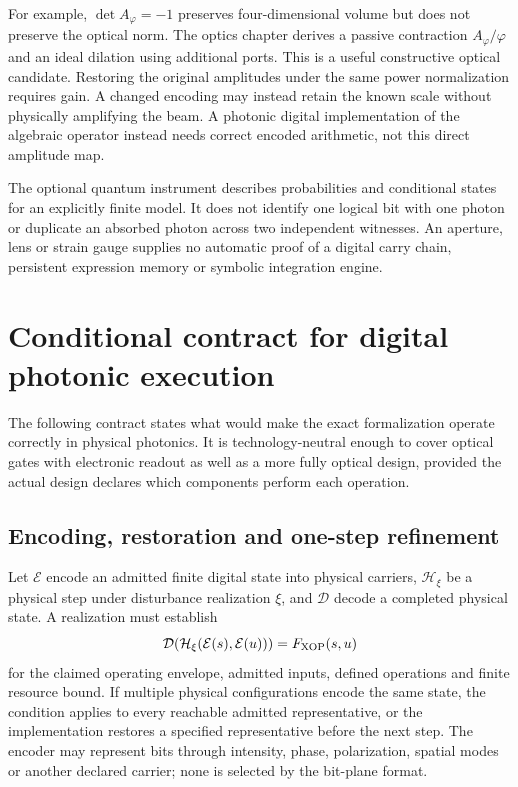 For example, $\det A_\varphi=-1$ preserves four-dimensional volume but does
not preserve the optical norm. The optics chapter derives a passive contraction
$A_\varphi/\varphi$ and an ideal dilation using additional ports. This is a
useful constructive optical candidate. Restoring the original amplitudes under the same power normalization requires
gain. A changed encoding may instead retain the known scale without physically
amplifying the beam. A photonic digital implementation of the algebraic
operator instead needs correct encoded arithmetic, not this direct amplitude map.

The optional quantum instrument describes probabilities and conditional states
for an explicitly finite model. It does not identify one logical bit with one
photon or duplicate an absorbed photon across two independent witnesses.
An aperture, lens or strain gauge supplies no automatic proof of a digital
carry chain, persistent expression memory or symbolic integration engine.

\section{Conditional contract for digital photonic execution}
\label{sec:want-refinement}
The following contract states what would make the exact formalization operate
correctly in physical photonics. It is technology-neutral enough to cover
optical gates with electronic readout as well as a more fully optical design,
provided the actual design declares which components perform each operation.

\subsection{Encoding, restoration and one-step refinement}
Let $\mathcal E$ encode an admitted finite digital state into physical carriers,
$\mathcal H_\xi$ be a physical step under disturbance realization $\xi$, and
$\mathcal D$ decode a completed physical state. A realization must establish
\begin{equation}
 \mathcal D\!\left(\mathcal H_\xi(\mathcal E(s),\mathcal E(u))\right)
        =F_{\rm XOP}(s,u)
 \label{eq:want-refine}
\end{equation}
for the claimed operating envelope, admitted inputs, defined operations and
finite resource bound. If multiple physical configurations encode the same
state, the condition applies to every reachable admitted representative,
or the implementation restores a specified representative before the next step.
The encoder may represent bits through intensity, phase, polarization, spatial
modes or another declared carrier; none is selected by the bit-plane format.

